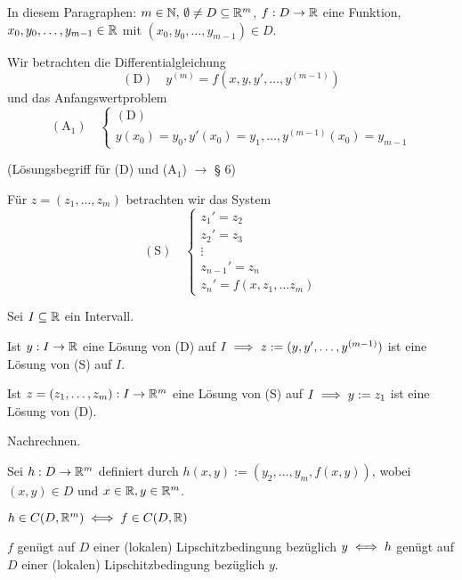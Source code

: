 \documentclass[a4paper,twoside,DIV15,BCOR12mm]{scrbook}
\begin{document}
In diesem Paragraphen: $m \in \mathbb{N}, \, \emptyset \neq D \subseteq \mathbb{R}^{m}$, $f:D\rightarrow \mathbb{R}$
eine Funktion, $x_0, y_0, \ldots, y_{m-1} \in \mathbb{R}$ mit $(x_0, y_0, \ldots, y_{m-1}) \in D$.

Wir betrachten die Differentialgleichung
$$(\text{D})\quad y^{(m)} = f(x, y, y', \ldots, y^{(m-1)})$$
und das Anfangswertproblem
$$(\text{A}_1)\quad
\begin{cases}
(\text{D}) \\
y(x_0) = y_0, y'(x_0) = y_1, \ldots, y^{(m-1)}(x_0) = y_{m-1}
\end{cases}$$

(Lösungsbegriff für (D) und (A$_1$) $\rightarrow$ § 6)

Für $z = (z_1, \ldots, z_m)$ betrachten wir das System
$$(\text{S}) \quad
\begin{cases}
z_1'=z_2\\
z_2'=z_3\\
\vdots\\
z_{n-1}'=z_n\\
z_n'=f(x, z_1, \ldots z_m)
\end{cases}$$

\begin{satz} %
Sei $I \subseteq \mathbb{R}$ ein Intervall.
\begin{liste}
\item Ist $y:I\rightarrow \mathbb{R}$ eine Lösung von (D) auf $I \implies z := (y, y', \ldots, y^{(m-1)})$ ist eine Lösung von (S) auf $I$.
\item Ist $z = (z_1, \ldots , z_m):I \rightarrow \mathbb{R}^m$ eine Lösung von (S) auf $I \implies y:=z_1$ ist eine Lösung von (D).
\end{liste}
\end{satz}

\begin{beweis}
Nachrechnen.
\end{beweis}

\begin{satz} %
Sei $h:D \rightarrow \mathbb{R}^m$ definiert durch $h(x,y):=(y_2, \ldots, y_m, f(x,y))$, wobei $(x,y) \in D$ und $x \in \mathbb{R}, y \in \mathbb{R}^m$.
\begin{liste}
\item $h \in C(D, \mathbb{R}^m) \iff f \in C(D,\mathbb{R})$
\item $f$ genügt auf $D$ einer (lokalen) Lipschitzbedingung bezüglich $y \iff h$ genügt auf $D$ einer (lokalen) Lipschitzbedingung bezüglich $y$.
\end{liste}
\end{satz}
\end{document}
